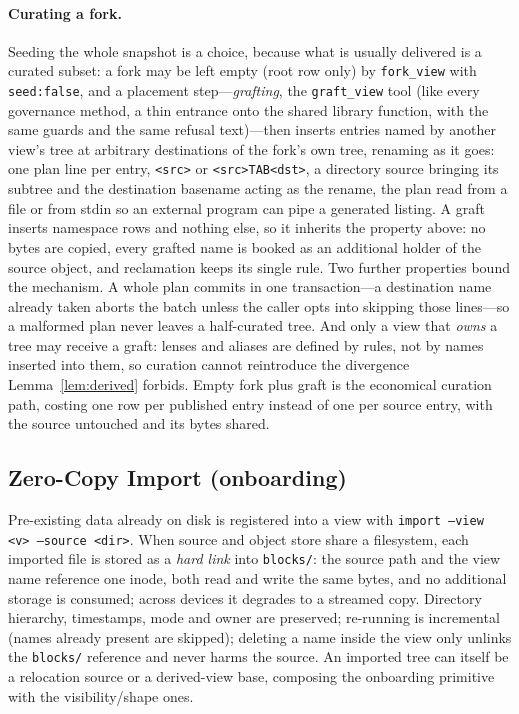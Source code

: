 \documentclass[numberedsection,acmtos]{acmart}
\begin{document}
\paragraph{Curating a fork.} Seeding the whole snapshot is a choice, because what
is usually delivered is a curated subset: a fork may be left empty (root row
only) by \texttt{fork\_view} with \texttt{seed:false}, and a placement
step---\emph{grafting}, the \texttt{graft\_view} tool (like every governance
method, a thin entrance onto the shared library function, with the same guards and
the same refusal text)---then inserts entries named by another
view's tree at arbitrary destinations of the fork's own tree, renaming as it goes:
one plan line per entry, \texttt{\textless src\textgreater{}} or
\texttt{\textless src\textgreater{}TAB\textless dst\textgreater{}}, a directory
source bringing its subtree and the destination basename acting as the rename, the
plan read from a file or from stdin so an external program can pipe a generated
listing. A graft inserts namespace rows and nothing else, so it inherits the
property above: no bytes are copied, every grafted name is booked as an
additional holder of the source object, and reclamation keeps its single rule.
Two further properties bound the mechanism. A whole plan commits in one
transaction---a destination name already taken aborts the batch unless the caller
opts into skipping those lines---so a malformed plan never leaves a half-curated
tree. And only a view that \emph{owns} a tree may receive a graft: lenses and
aliases are defined by rules, not by names inserted into them, so curation cannot
reintroduce the divergence Lemma~\ref{lem:derived} forbids. Empty fork plus graft
is the economical curation path, costing one row per published entry instead of
one per source entry, with the source untouched and its bytes shared.

\subsection{Zero-Copy Import (onboarding)}\label{sec:import}
Pre-existing data already on disk is registered into a view with
\texttt{import --view \textless v\textgreater{} --source \textless dir\textgreater{}}. When source and object store share a
filesystem, each imported file is stored as a \emph{hard link} into
\texttt{blocks/}: the source path and the view name reference one inode, both
read and write the same bytes, and no additional storage is consumed; across
devices it degrades to a streamed copy. Directory hierarchy, timestamps, mode
and owner are preserved; re-running is incremental (names already present are
skipped); deleting a name inside the view only unlinks the \texttt{blocks/}
reference and never harms the source. An imported tree can itself be a
relocation source or a derived-view base, composing the onboarding primitive
with the visibility/shape ones.
\end{document}
